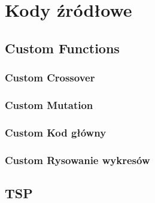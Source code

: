 \section{Kody źródłowe}

\subsection{Custom Functions}

\subsubsection{Custom Crossover}

\subsubsection{Custom Mutation}

\subsubsection{Custom Kod główny}

\subsubsection{Custom Rysowanie wykresów}


\subsection{TSP}

